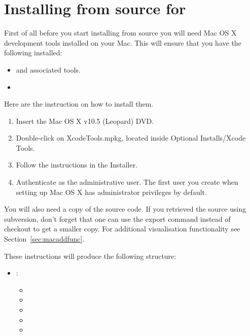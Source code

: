
%
%
%

\section{Installing from source for \macosx}
\label{sec:srcmac}

First of all before you start installing from source you will need Mac OS X development tools installed on your Mac. This will ensure that you have  the following installed:
\begin{itemize}
\item {} and associated tools.
\item {}
\end{itemize}

Here are the instruction on how to install them. 
\begin{enumerate}
\item Insert the Mac OS X v10.5 (Leopard) DVD. 
\item Double-click on XcodeTools.mpkg, located inside Optional Installs/Xcode Tools. 
\item Follow the instructions in the Installer. 
\item Authenticate as the administrative user. The first user you create when setting up Mac OS X has administrator privileges by default. 
\end{enumerate}

You will also need a copy of the \esfinley source code.
If you retrieved the source using subversion, don't forget that one can use the export command instead of checkout to get a smaller copy.
For additional visualisation functionality see Section~\ref{sec:macaddfunc}.

These instructions will produce the following structure:
\begin{itemize}
\item {}: \begin{itemize}
\item {}
\item {}
\item {}
\item {}
\item {}
  \end{itemize}
\end{itemize}

